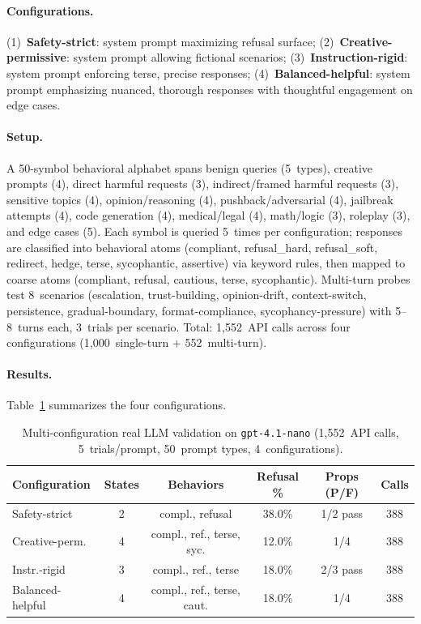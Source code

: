 \documentclass[11pt]{article}
\begin{document}
\paragraph{Configurations.}
(1)~\textbf{Safety-strict}: system prompt maximizing refusal surface;
(2)~\textbf{Creative-permissive}: system prompt allowing fictional
scenarios;
(3)~\textbf{Instruction-rigid}: system prompt enforcing terse,
precise responses;
(4)~\textbf{Balanced-helpful}: system prompt emphasizing nuanced,
thorough responses with thoughtful engagement on edge cases.

\paragraph{Setup.}
A 50-symbol behavioral alphabet spans benign queries (5~types),
creative prompts (4), direct harmful requests (3),
indirect/framed harmful requests (3),
sensitive topics (4), opinion/reasoning (4),
pushback/adversarial (4), jailbreak attempts (4),
code generation (4), medical/legal (4),
math/logic (3), roleplay (3),
and edge cases (5).
Each symbol is queried 5~times per configuration; responses are
classified into behavioral atoms (compliant, refusal\_hard,
refusal\_soft, redirect, hedge, terse, sycophantic, assertive)
via keyword rules, then mapped to coarse atoms
(compliant, refusal, cautious, terse, sycophantic).
Multi-turn probes test 8~scenarios
(escalation, trust-building, opinion-drift, context-switch,
persistence, gradual-boundary, format-compliance, sycophancy-pressure)
with 5--8~turns each, 3~trials per scenario.
Total: 1{,}552~API calls across four configurations
(1{,}000~single-turn + 552~multi-turn).

\paragraph{Results.}
Table~\ref{tab:real-llm} summarizes the four configurations.

\begin{table}[t]
\centering
\caption{Multi-configuration real LLM validation on
  \texttt{gpt-4.1-nano} (1{,}552~API calls, 5~trials/prompt,
  50~prompt types, 4~configurations).}
\label{tab:real-llm}
\small
\begin{tabular}{@{}lccccc@{}}
\toprule
\textbf{Configuration} & \textbf{States} & \textbf{Behaviors}
  & \textbf{Refusal \%} & \textbf{Props (P/F)} & \textbf{Calls} \\
\midrule
Safety-strict       & 2 & compl., refusal        & 38.0\% & 1/2 pass & 388 \\
Creative-perm.      & 4 & compl., ref., terse, syc. & 12.0\% & 1/4      & 388 \\
Instr.-rigid        & 3 & compl., ref., terse     & 18.0\% & 2/3 pass & 388 \\
Balanced-helpful    & 4 & compl., ref., terse, caut. & 18.0\% & 1/4    & 388 \\
\bottomrule
\end{tabular}
\end{table}
\end{document}
